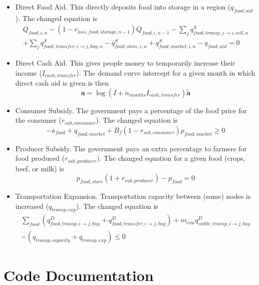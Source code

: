 \documentclass[letter,12pt]{article}
\begin{document}
\begin{itemize}
\item Direct Food Aid.  This directly deposits food into storage in a region ($q_{food,aid}$).  The changed equation is
\begin{align}
Q_{food,i,n} - \left(1-r_{loss,food,storage,n-1}\right) Q_{food,i,n-1} - \sum_j q_{food,transp,j \rightarrow i,sell,n}^S \nonumber \\
+ \sum_j q_{food,transfer,i \rightarrow j,buy,n}^S - q_{food,store,i,n}^S + q_{food,market,i,n}^S - q_{food,aid} = 0
\end{align}
\item Direct Cash Aid.  This gives people money to temporarily increase their income ($I_{cash,transfer}$).  The demand curve intercept for a given month in which direct cash aid is given is then
\begin{equation}
\mathbf{a} = \log \left(I + n_{months} I_{cash,transfer}\right) \tilde{\mathbf{a}}
\end{equation}
\item Consumer Subsidy.  The government pays a percentage of the food price for the consumer ($r_{sub,consumer}$).  The changed equation is
\begin{equation}
- a_{food} + q_{food,market} + B_f \left( 1 - r_{sub,consumer} \right) p_{food,market} \geq 0
\end{equation}
\item Producer Subsidy.  The government pays an extra percentage to farmers for food produced ($r_{sub,producer}$).  The changed equation for a given food (crops, beef, or milk) is
\begin{equation}
p_{food,store} \left( 1 + r_{sub,producer}\right) - p_{food} = 0
\end{equation}
\item Transportation Expansion.  Transportation capacity between (some) nodes is increased ($q_{transp,exp}$).  The changed equation is
\begin{gather}
\sum_{food} \left( q_{food,transp,i \rightarrow j,buy}^D + q_{food,transfer,i \rightarrow j,buy}^D \right) + m_{cow} q_{cattle,transp,i \rightarrow j,buy}^D \nonumber \\ 
- \left(q_{transp,capacity} + q_{transp,exp} \right) \leq 0
\end{gather}

\end{itemize}

\section{Code Documentation}
\end{document}
